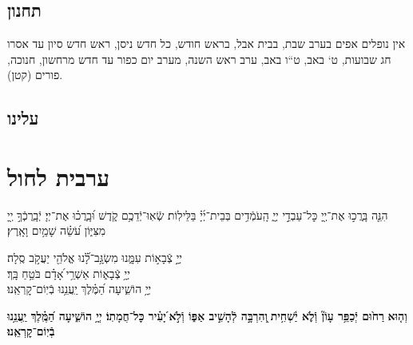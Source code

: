 \documentclass[twoside, openany, parskip=half, 11pt]{book}
\begin{document}
\section*{ תחנון }

\begin{scriptsize}
\textsf{אין נופלים אפים בערב שבת, בבית אבל, בראש חודש, כל חדש ניסן, ראש חדש סיון עד אסרו חג שבועות, ט` באב, ט``ו באב, ערב ראש השנה, מערב יום כפור עד חדש מרחשון, חנוכה, פורים (קטן).}

\end{scriptsize}


\nefilasapayim

\nextpage
\shomeryisroel

\fullkaddish

\vspace{\baselineskip}

\label{mincha aleinu}
\section*{ עלינו }


\aleinu


\vfill

\quad{}\quad{}

\chapter[ערבית לחול]{ ערבית לחול }

הִנֵּ֤ה בָּֽרֲכ֣וּ אֶת־יְ֖יָ כׇּל־עַבְדֵ֣י יְיָ֑ הָֽעֹמְֿדִ֥ים בְּבֵית־יְ֜יָ֗ בַּלֵּילֽוֹת׃ שְֿׂאֽוּ־יְֿדֵכֶ֥ם קֹ֑דֶשׁ וּ֝בָֽרֲכ֗וּ אֶת־יְיָ׃ יְֿבָֽרֶכְֿךָ֣ יְ֖יָ מִצִּיּ֑וֹן עֹ֝שֵׂ֗ה שָׁמַ֥יִם וָאָֽרֶץ׃

יְיָ֣ צְֿבָא֣וֹת עִמָּ֑נוּ מִשְׂגָּ֥ב־לָ֝֗נוּ אֱלֹהֵ֖י יַעֲקֹ֣ב סֶֽלָה׃  \hfill
{} \\
יְיָ֥ צְֿבָא֑וֹת אַשְׁרֵ֥י ֝אָדָ֗ם בֹּטֵ֥חַ בָּֽךְ׃  \hfill
{} \\
יְיָ֥ הוֹשִׁ֑יעָה הַ֝מֶּ֗לֶךְ יַֽעֲנֵ֥נוּ בְֿיֽוֹם־קׇרְאֵֽנוּ׃  \hfill {}


\halfkaddish


\textbf{וְה֤וּא}\textbf{
רַח֙וּם יְֿכַפֵּ֥ר עָוֹן֘ וְֿלֹ֢א יַ֫שְׁחִ֥ית ֖וְהִרְבָּ֣ה לְֿהָשִׁ֣יב אַפּ֑וֹ וְֿלֹ֣א ֝יָעִ֗יר כׇּל־חֲמָתֽוֹ׃ יְיָ֥ הוֹשִׁ֑יעָה הַ֝מֶּֽ֗לֶךְ יַֽעֲנֵ֥נוּ בְֿיֽוֹם־קׇרְאֵֽנוּ׃}
\end{document}
